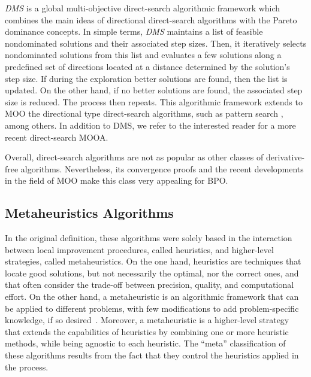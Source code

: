 	\textit{\ac{DMS}} \cite{Custodio2010} is a global multi-objective direct-search algorithmic framework which combines the main ideas of directional direct-search algorithms with the Pareto dominance concepts. In simple terms, \textit{\ac{DMS}} maintains a list of feasible nondominated solutions and their associated step sizes. Then, it iteratively selects nondominated solutions from this list and evaluates a few solutions along a predefined set of directions located at a distance determined by the solution's step size. If during the exploration better solutions are found, then the list is updated. On the other hand, if no better solutions are found, the associated step size is reduced. The process then repeats. This algorithmic framework extends to \ac{MOO} the directional type direct-search algorithms, such as pattern search \cite{Kolda2003}, among others. In addition to \ac{DMS}, we refer \cite{Custodio2018} to the interested reader for a more recent direct-search \ac{MOOA}.
	
	Overall, direct-search algorithms are not as popular as other classes of derivative-free algorithms. Nevertheless, its convergence proofs and the recent developments in the field of \ac{MOO} make this class very appealing for \ac{BPO}. 
	
	\subsection{Metaheuristics Algorithms}
	\label{ssec:metaheuristics}
	In the original definition, these algorithms were solely based in the interaction between local improvement procedures, called heuristics, and higher-level strategies, called metaheuristics. On the one hand, heuristics are techniques that locate good solutions, but not necessarily the optimal, nor the correct ones, and that often consider the trade-off between precision, quality, and computational effort. On the other hand, a metaheuristic is an algorithmic framework that can be applied to different problems, with few modifications to add problem-specific knowledge, if so desired~\cite{Glover2003Metaheuristics}. Moreover, a metaheuristic is a higher-level strategy that extends the capabilities of heuristics by combining one or more heuristic methods, while being agnostic to each heuristic. The ``meta'' classification of these algorithms results from the fact that they control the heuristics applied in the process.
	
